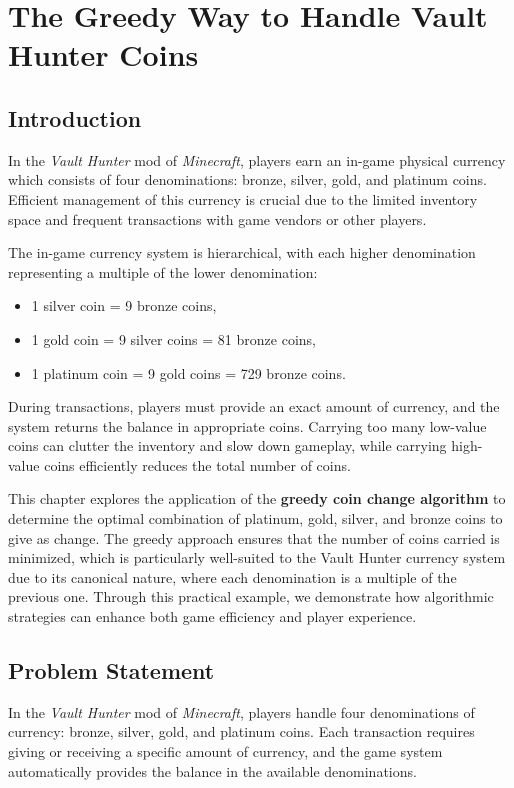\documentclass[12pt,a4paper]{report}
\begin{document}
\chapter{The Greedy Way to Handle Vault Hunter Coins}
\section{Introduction}

In the \textit{Vault Hunter} mod of \textit{Minecraft}, players earn an in-game physical currency which consists of four denominations: bronze, silver, gold, and platinum coins. Efficient management of this currency is crucial due to the limited inventory space and frequent transactions with game vendors or other players. 

The in-game currency system is hierarchical, with each higher denomination representing a multiple of the lower denomination:
\begin{itemize}
    \item 1 silver coin = 9 bronze coins,
    \item 1 gold coin = 9 silver coins = 81 bronze coins,
    \item 1 platinum coin = 9 gold coins = 729 bronze coins.
\end{itemize}

During transactions, players must provide an exact amount of currency, and the system returns the balance in appropriate coins. Carrying too many low-value coins can clutter the inventory and slow down gameplay, while carrying high-value coins efficiently reduces the total number of coins. 

This chapter explores the application of the \textbf{greedy coin change algorithm} to determine the optimal combination of platinum, gold, silver, and bronze coins to give as change. The greedy approach ensures that the number of coins carried is minimized, which is particularly well-suited to the Vault Hunter currency system due to its canonical nature, where each denomination is a multiple of the previous one. Through this practical example, we demonstrate how algorithmic strategies can enhance both game efficiency and player experience.

\section{Problem Statement}

In the \textit{Vault Hunter} mod of \textit{Minecraft}, players handle four denominations of currency: bronze, silver, gold, and platinum coins. Each transaction requires giving or receiving a specific amount of currency, and the game system automatically provides the balance in the available denominations.  
\end{document}
